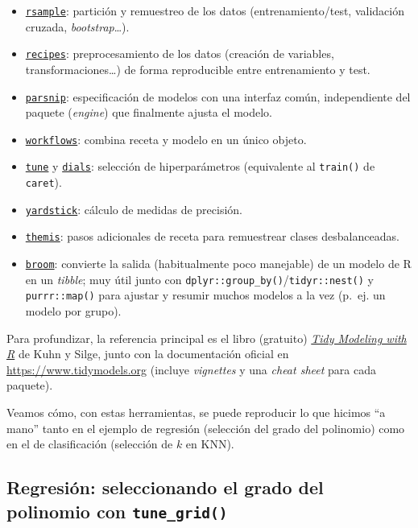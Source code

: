 \documentclass[
]{book}
\providecommand{\tightlist}{%
  \setlength{\itemsep}{0pt}\setlength{\parskip}{0pt}}
\theoremstyle{break}
\theoremstyle{nonumberplain}
\begin{document}
\begin{itemize}
\tightlist
\item
  \href{https://rsample.tidymodels.org}{\texttt{rsample}}: partición y remuestreo de los datos (entrenamiento/test, validación cruzada, \emph{bootstrap}\ldots).
\item
  \href{https://recipes.tidymodels.org}{\texttt{recipes}}: preprocesamiento de los datos (creación de variables, transformaciones\ldots) de forma reproducible entre entrenamiento y test.
\item
  \href{https://parsnip.tidymodels.org}{\texttt{parsnip}}: especificación de modelos con una interfaz común, independiente del paquete (\emph{engine}) que finalmente ajusta el modelo.
\item
  \href{https://workflows.tidymodels.org}{\texttt{workflows}}: combina receta y modelo en un único objeto.
\item
  \href{https://tune.tidymodels.org}{\texttt{tune}} y \href{https://dials.tidymodels.org}{\texttt{dials}}: selección de hiperparámetros (equivalente al \texttt{train()} de \texttt{caret}).
\item
  \href{https://yardstick.tidymodels.org}{\texttt{yardstick}}: cálculo de medidas de precisión.
\item
  \href{https://themis.tidymodels.org}{\texttt{themis}}: pasos adicionales de receta para remuestrear clases desbalanceadas.
\item
  \href{https://broom.tidymodels.org}{\texttt{broom}}: convierte la salida (habitualmente poco manejable) de un modelo de R en un \emph{tibble}; muy útil junto con \texttt{dplyr::group\_by()}/\texttt{tidyr::nest()} y \texttt{purrr::map()} para ajustar y resumir muchos modelos a la vez (p.~ej. un modelo por grupo).
\end{itemize}

Para profundizar, la referencia principal es el libro (gratuito) \href{https://www.tmwr.org}{\emph{Tidy Modeling with R}} de Kuhn y Silge, junto con la documentación oficial en \url{https://www.tidymodels.org} (incluye \emph{vignettes} y una \emph{cheat sheet} para cada paquete).

Veamos cómo, con estas herramientas, se puede reproducir lo que hicimos ``a mano'' tanto en el ejemplo de regresión (selección del grado del polinomio) como en el de clasificación (selección de \(k\) en KNN).

\subsection{\texorpdfstring{Regresión: seleccionando el grado del polinomio con \texttt{tune\_grid()}}{Regresión: seleccionando el grado del polinomio con tune\_grid()}}\label{tidymodels-reg}
\end{document}
